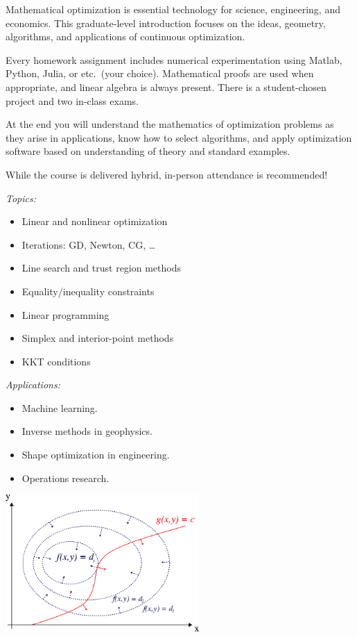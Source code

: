 \documentclass[12pt]{amsart}
\begin{document}
Mathematical optimization is essential technology for science, engineering, and economics.  This graduate-level introduction focuses on the ideas, geometry, algorithms, and applications of continuous optimization.

\smallskip
Every homework assignment includes numerical experimentation using Matlab, Python, Julia, or etc.~(your choice).  Mathematical proofs are used when appropriate, and linear algebra is always present.  There is a student-chosen project and two in-class exams.

\smallskip
At the end you will understand the mathematics of optimization problems as they arise in applications, know how to select algorithms, and apply optimization software based on understanding of theory and standard examples.

\smallskip
While the course is delivered hybrid, in-person attendance is recommended!

\bigskip \noindent 
\begin{minipage}[t]{0.55\textwidth} \emph{Topics:}
\begin{itemize}
\item Linear and nonlinear optimization
\item Iterations: GD, Newton, CG, \dots
\item Line search and trust region methods
\item Equality/inequality constraints
\item Linear programming
\item Simplex and interior-point methods
\item KKT conditions
\end{itemize}

\bigskip
\emph{Applications:}
\begin{itemize}
\item Machine learning.
\item Inverse methods in geophysics.
\item Shape optimization in engineering.
\item Operations research.
\end{itemize}
\end{minipage}
\begin{minipage}[t]{0.45\textwidth}
\smallskip

\centering
\includegraphics[height=52mm]{../images/lagrange.png}
\end{minipage}
\end{document}
